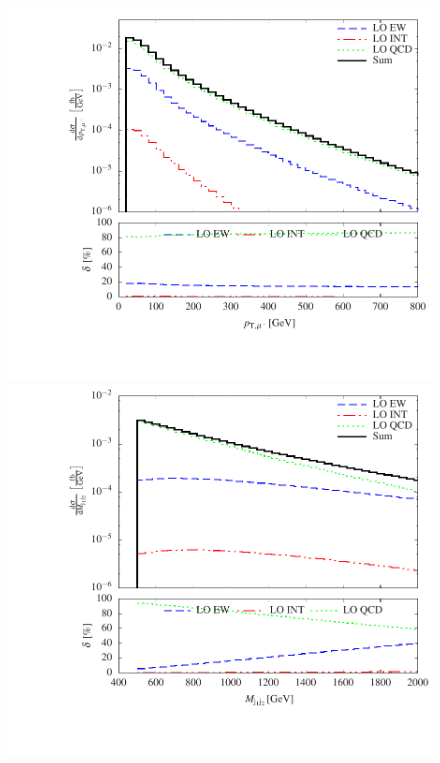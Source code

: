 \documentclass[11pt]{cernrep}
\begin{document}
\begin{figure}[htbp]
\begin{center}
   \includegraphics[scale=0.5]{figs/histogram_transverse_momentum_muon}
   \includegraphics[scale=0.5]{figs/histogram_invariant_mass_mjj12}

\end{center}
\end{figure}
\end{document}
